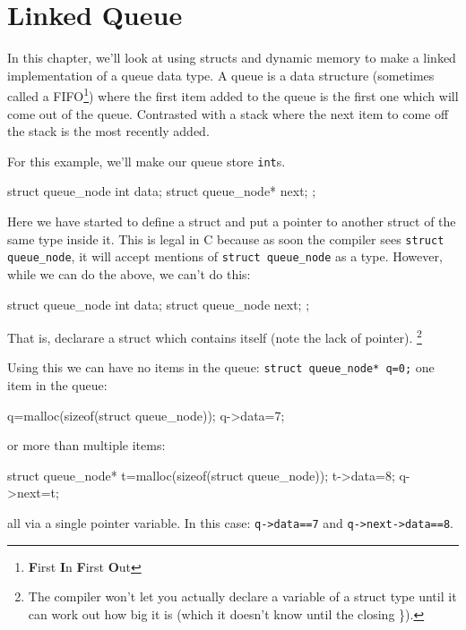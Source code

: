 
\chapter{Linked Queue}


In this chapter, we'll look at using structs and dynamic memory to make a linked implementation of a queue data type.
A queue is a data structure (sometimes called a FIFO\footnote{\textbf{F}irst \textbf{I}n \textbf{F}irst \textbf{O}ut}) 
where the first item added to the queue is the first one which will come out of the queue.
Contrasted with a stack where the next item to come off the stack is the most recently added.

For this example, we'll make our queue store \texttt{int}s.

\begin{codeblock}
struct queue_node {
    int data;
    struct queue_node* next;
};
\end{codeblock}

Here we have started to define a struct and put a pointer to another struct of the same type inside it.
This is legal in C because as soon the compiler sees \texttt{struct queue\_node}, it will accept mentions of \texttt{struct queue\_node}
as a type. However, while we can do the above, we can't do this:

\begin{codeblock}
struct queue_node {
    int data;
    struct queue_node next;
};
\end{codeblock}
That is, declarare a struct which contains itself (note the lack of pointer).
\footnote{The compiler won't let you actually declare a variable of a 
struct type until it can work out how big it is (which it doesn't know until the closing \}).}



Using this we can have no items in the queue:
\lstinline!struct queue_node* q=0;!
one item in the queue:
\begin{codeblock}
q=malloc(sizeof(struct queue_node));
q->data=7;
\end{codeblock}
or more than multiple items:
\begin{codeblock}
struct queue_node* t=malloc(sizeof(struct queue_node));
t->data=8;
q->next=t;
\end{codeblock}
all via a single pointer variable.
In this case: \lstinline!q->data==7! and \lstinline!q->next->data==8!.

